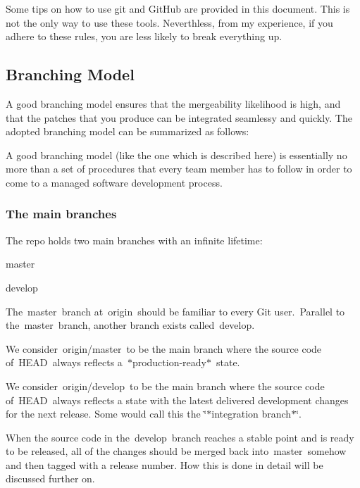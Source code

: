 Some tips on how to use git and Git\+Hub are provided in this document. This is not the only way to use these tools. Neverthless, from my experience, if you adhere to these rules, you are less likely to break everything up.

\subsection*{Branching Model}

A good branching model ensures that the mergeability likelihood is high, and that the patches that you produce can be integrated seamlessy and quickly. The adopted branching model can be summarized as follows\+:



A good branching model (like the one which is described here) is essentially no more than a set of procedures that every team member has to follow in order to come to a managed software development process.

\subsubsection*{The main branches}



The repo holds two main branches with an infinite lifetime\+:


\begin{DoxyItemize}
\item {\ttfamily master}
\item {\ttfamily develop}
\end{DoxyItemize}

The {\ttfamily master} branch at origin should be familiar to every Git user.\+ \+Parallel to the {\ttfamily master} branch, another branch exists called {\ttfamily develop}.

We consider {\ttfamily origin/master} to be the main branch where the source code of {\ttfamily H\+E\+AD} always reflects a $\ast$production-\/ready$\ast$ state.

We consider {\ttfamily origin/develop} to be the main branch where the source code of {\ttfamily H\+E\+AD} always reflects a state with the latest delivered development changes for the next release. Some would call this the \char`\"{}$\ast$integration branch$\ast$\char`\"{}.

When the source code in the {\ttfamily develop} branch reaches a stable point and is ready to be released, all of the changes should be merged back into {\ttfamily master} somehow and then tagged with a release number. How this is done in detail will be discussed further on.


